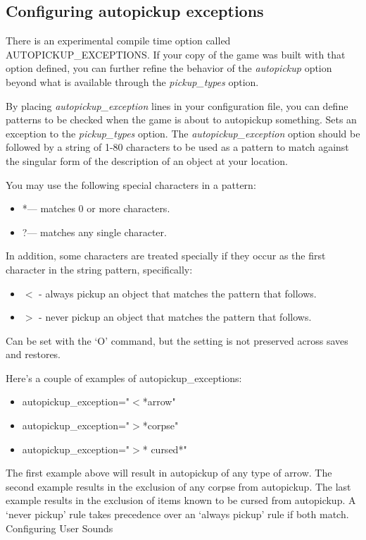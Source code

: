 \subsection{Configuring autopickup exceptions}

There is an experimental compile time option called AUTOPICKUP\_EXCEPTIONS.  
If your copy of the game was built with that option defined, you can 
further refine the behavior of the
{\it autopickup }
option beyond what is available through the 
{\it pickup\_types }
option. 

By placing 
{\it autopickup\_exception }
lines in your configuration
file, you can define patterns to be checked when the game is about to
autopickup something.
Sets an exception to the 
{\it pickup\_types }
option.
The
{\it autopickup\_exception }
option should be followed by a string of 1-80 characters to be used as a 
pattern to match against the singular form of the description of an 
object at your location.

You may use the following special characters in a pattern:
\begin{itemize}
\item  *--- matches 0 or more characters.
\item  ?--- matches any single character.
\end{itemize}

In addition, some characters are treated specially if they occur as the first 
character in the string pattern, specifically:
\begin{itemize}
\item $<$ - always pickup an object that matches the pattern that follows.
\item $>$ - never pickup an object that matches the pattern that follows.
\end{itemize}

Can be set with the `O' command, but the setting is not preserved
across saves and restores.

Here's a couple of examples of autopickup\_exceptions:
\begin{itemize}
\item autopickup\_exception="$<$*arrow"
\item autopickup\_exception="$>$*corpse"
\item autopickup\_exception="$>$* cursed*"
\end{itemize}
The first example above will result in autopickup of any type of arrow.
The second example results in the exclusion of any corpse from autopickup.
The last example results in the exclusion of items known to be cursed from autopickup.
A `never pickup' rule takes precedence over an `always pickup' rule if both match.
Configuring User Sounds

